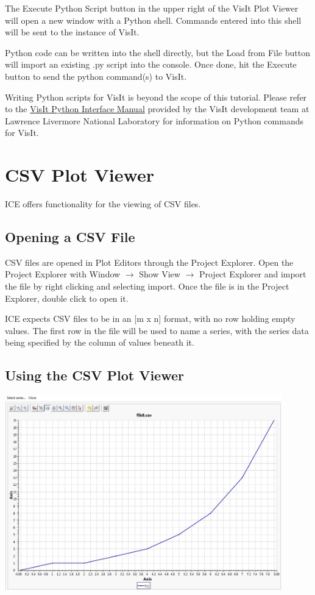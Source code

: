 The Execute Python Script button in the upper right of the VisIt Plot Viewer
will open a new window with a Python shell. Commands entered into this shell
will be sent to the instance of VisIt. 

Python code can be written into the shell directly, but the Load from File
button will import an existing .py script into the console. Once done, hit the
Execute button to send the python command(s) to VisIt.

Writing Python scripts for VisIt is beyond the scope of this tutorial. Please
refer to the
\href{https://wci.llnl.gov/simulation/computer-codes/visit/manuals}{VisIt Python
Interface Manual} provided by the VisIt development team at Lawrence Livermore
National Laboratory for information on Python commands for VisIt.

\section{CSV Plot Viewer}

ICE offers functionality for the viewing of CSV files. 

\subsection{Opening a CSV File}

CSV files are opened in Plot Editors through the Project Explorer. Open the
Project Explorer with Window $\rightarrow$ Show View $\rightarrow$ Project
Explorer and import the file by right clicking and selecting import. Once the
file is in the Project Explorer, double click to open it.

ICE expects CSV files to be in an [m x n] format, with no row holding empty
values. The first row in the file will be used to name a series, with the series
data being specified by the column of values beneath it.

\subsection{Using the CSV Plot Viewer}

\begin{center}
\includegraphics[width=12cm]{images/CSVPlotViewer}
\end{center}

